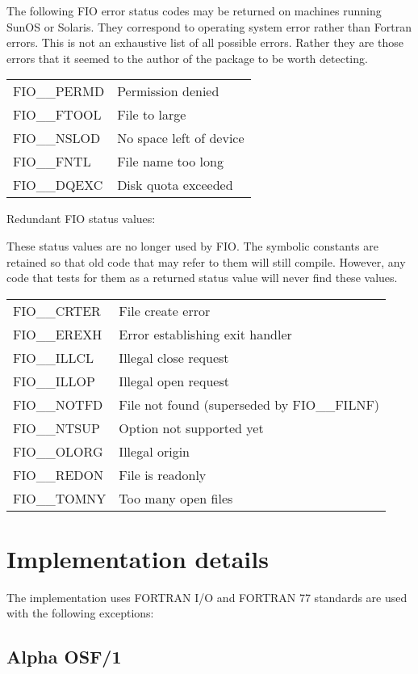 \documentclass[twoside,11pt,nolof]{starlink}
\begin{document}
The following FIO error status codes may be returned on machines running SunOS
or Solaris. They correspond to operating system error rather than Fortran
errors. This is not an exhaustive list of all possible errors. Rather they are
those errors that it seemed to the author of the package to be worth detecting.

\begin{tabular}{ll}
FIO\_\_PERMD & Permission denied \\
FIO\_\_FTOOL & File to large \\
FIO\_\_NSLOD & No space left of device \\
FIO\_\_FNTL  & File name too long \\
FIO\_\_DQEXC & Disk quota exceeded \\
\end{tabular}

Redundant FIO status values:

These status values are no longer used by FIO. The symbolic constants are
retained so that old code that may refer to them will still compile. However,
any code that tests for them as a returned status value will never find these
values.

\begin{tabular}{ll}
FIO\_\_CRTER & File create error \\
FIO\_\_EREXH & Error establishing exit handler \\
FIO\_\_ILLCL & Illegal close request \\
FIO\_\_ILLOP & Illegal open request \\
FIO\_\_NOTFD & File not found (superseded by FIO\_\_FILNF) \\
FIO\_\_NTSUP & Option not supported yet \\
FIO\_\_OLORG & Illegal origin \\
FIO\_\_REDON & File is readonly \\
FIO\_\_TOMNY & Too many open files \\
\end{tabular}

\section{Implementation details}

The implementation uses FORTRAN I/O and FORTRAN 77 standards are used with
the following exceptions:

\subsection{Alpha OSF/1}
\end{document}
